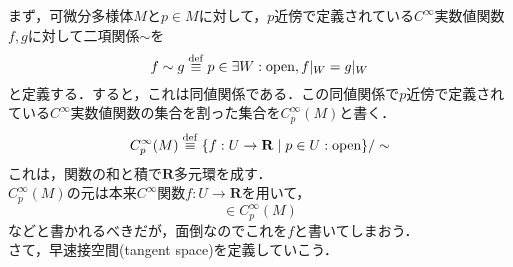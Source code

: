 

まず，可微分多様体$M$と$p\in M$に対して，$p$近傍で定義されている$C^{\infty}$実数値関数$f,g$に対して二項関係$\sim$を
\begin{equation*}
  f\sim g \stackrel{\mathrm{def}}{\equiv} p\in \exists W:\text{open}, f|_{W} = g|_{W}
\end{equation*}
と定義する．すると，これは同値関係である．この同値関係で$p$近傍で定義されている$C^{\infty}$実数値関数の集合を割った集合を$C^{\infty}_{p}(M)$と書く．
\begin{equation*}
  C^{\infty}_{p}(M) \stackrel{\mathrm{def}}{\equiv} \{f:U\to \mathbf{R}\mid p\in U:\text{open}\}/\sim
\end{equation*}
これは，関数の和と積で$\mathbf{R}$多元環を成す．\\
$C^{\infty}_{p}(M)$の元は本来$C^{\infty}$関数$f:U\to \mathbf{R}$を用いて，
\begin{equation*}
  [f] \in C^{\infty}_{p}(M)
\end{equation*}
などと書かれるべきだが，面倒なのでこれを$f$と書いてしまおう．\\
さて，早速接空間(tangent space)を定義していこう．


